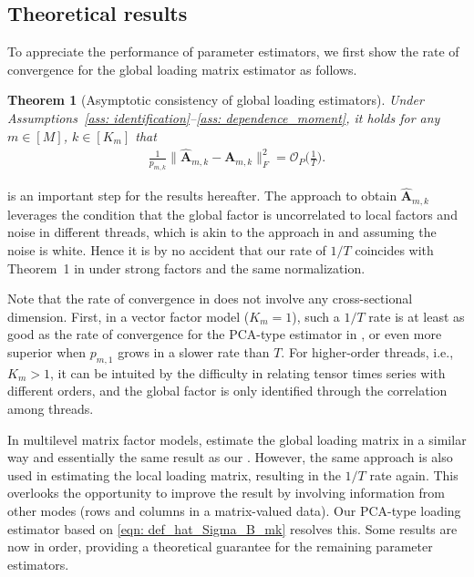 \documentclass[aos]{imsart}
\theoremstyle{plain}
\newtheorem{theorem}{Theorem}[section]
\theoremstyle{definition}
\def\wh#1{\widehat{#1}}
\def\cO{\mathcal{O}}
\def\bA{\mathbf{A}}
\begin{document}
\subsection{Theoretical results}\label{subsec: theorem}

To appreciate the performance of parameter estimators, we first show the rate of convergence for the global loading matrix estimator as follows.


\begin{theorem}[Asymptotic consistency of global loading estimators]\label{thm: global_loading}
Under Assumptions~\ref{ass: identification}--\ref{ass: dependence_moment}, it holds for any $m\in[M]$, $k\in[K_m]$ that
\begin{align*}
    \frac{1}{p_{m,k}} \Big\| \wh{\bA}_{m,k} -\bA_{m,k} \Big\|_F^2 = \cO_P\Big( \frac{1}{T} \Big) .
\end{align*}
\end{theorem}

 is an important step for the results hereafter. The approach to obtain $\wh{\bA}_{m,k}$ leverages the condition that the global factor is uncorrelated to local factors and noise in different threads, which is akin to the approach in \cite{Lametal2011} and \cite{Wangetal2019} assuming the noise is white. Hence it is by no accident that our rate of $1/T$ coincides with  Theorem~1 in \cite{Wangetal2019} under strong factors and the same normalization.

Note that the rate of convergence in  does not involve any cross-sectional dimension. First, in a vector factor model ($K_m=1$), such a $1/T$ rate is at least as good as the rate of convergence for the PCA-type estimator in \cite{BaiNg2002}, or even more superior when $p_{m,1}$ grows in a slower rate than $T$. For higher-order threads, i.e., $K_m>1$, it can be intuited by the difficulty in relating tensor times series with different orders, and the global factor is only identified through the correlation among threads.

In multilevel matrix factor models, \cite{Zhangetal2025} estimate the global loading matrix in a similar way and essentially the same result as our . However, the same approach is also used in estimating the local loading matrix, resulting in the $1/T$ rate again. This overlooks the opportunity to improve the result by involving information from other modes (rows and columns in a matrix-valued data). Our PCA-type loading estimator based on \eqref{eqn: def_hat_Sigma_B_mk} resolves this. Some results are now in order, providing a theoretical guarantee for the remaining parameter estimators.
\end{document}
